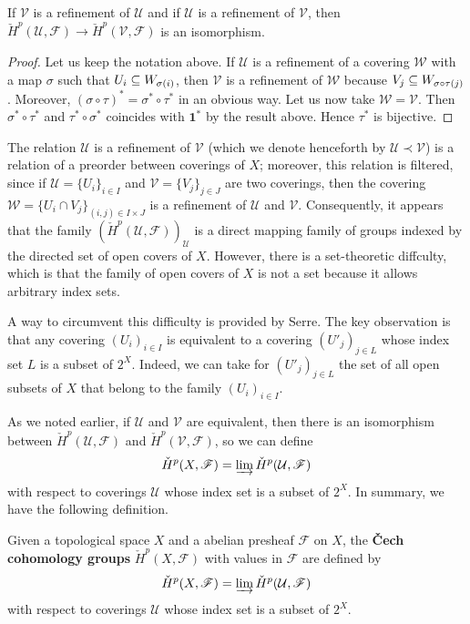 \begin{corollary}
If $\mathcal{V}$ is a refinement of $\mathcal{U}$ and if $\mathcal{U}$ is a refinement of $\mathcal{V}$, then $\check{H}^p(\mathcal{U},\mathscr{F})\to\check{H}^p(\mathcal{V},\mathscr{F})$ is an isomorphism.
\end{corollary}
\begin{proof}
Let us keep the notation above. If $\mathcal{U}$ is a refinement of a covering $\mathcal{W}$ with a map $\sigma$ such that $U_i\subseteq W_{\sigma(i)}$, then $\mathcal{V}$ is a refinement of $\mathcal{W}$ because $V_j\subseteq W_{\sigma\circ\tau(j)}$. Moreover, $(\sigma\circ\tau)^*=\sigma^*\circ\tau^*$ in an obvious way. Let us now take $\mathcal{W}=\mathcal{V}$. Then $\sigma^*\circ\tau^*$ and $\tau^*\circ\sigma^*$ coincides with $\mathbf{1}^*$ by the result above. Hence $\tau^*$ is bijective.
\end{proof}
The relation $\mathcal{U}$ is a refinement of $\mathcal{V}$ (which we denote henceforth by $\mathcal{U}\prec\mathcal{V}$) is a relation of a preorder between coverings of $X$; moreover, this relation is filtered, since if $\mathcal{U}=\{U_i\}_{i\in I}$ and $\mathcal{V}=\{V_j\}_{j\in J}$ are two coverings, then the covering $\mathcal{W}=\{U_i\cap V_j\}_{(i,j)\in I\times J}$ is a refinement of $\mathcal{U}$ and $\mathcal{V}$. Consequently, it appears that the family $(\check{H}^p(\mathcal{U},\mathscr{F}))_{\mathcal{U}}$ is a direct mapping family of groups indexed by the directed set of open covers of $X$. However, there is a set-theoretic diffculty, which is that the family of open covers of $X$ is not a set because it allows arbitrary index sets.\par
A way to circumvent this difficulty is provided by Serre. The key observation is that any covering $(U_i)_{i\in I}$ is equivalent to a covering $(U'_{j})_{j\in L}$ whose index set $L$ is a subset of $2^X$. Indeed, we can take for $(U'_{j})_{j\in L}$ the set of all open subsets of $X$ that belong to the family $(U_i)_{i\in I}$.\par
As we noted earlier, if $\mathcal{U}$ and $\mathcal{V}$ are equivalent, then there is an isomorphism between $\check{H}^p(\mathcal{U},\mathscr{F})$ and $\check{H}^p(\mathcal{V},\mathscr{F})$, so we can define
\[\check{H}^p(X,\mathscr{F})=\varinjlim\limits\check{H}^p(\mathcal{U},\mathscr{F})\]
with respect to coverings $\mathcal{U}$ whose index set is a subset of $2^X$. In summary, we have the following definition.
\begin{definition}
Given a topological space $X$ and a abelian presheaf $\mathscr{F}$ on $X$, the \textbf{\v{C}ech cohomology groups} $\check{H}^p(X,\mathscr{F})$ with values in $\mathscr{F}$ are defined by
\[\check{H}^p(X,\mathscr{F})=\varinjlim\limits\check{H}^p(\mathcal{U},\mathscr{F})\]
with respect to coverings $\mathcal{U}$ whose index set is a subset of $2^X$.
\end{definition}
